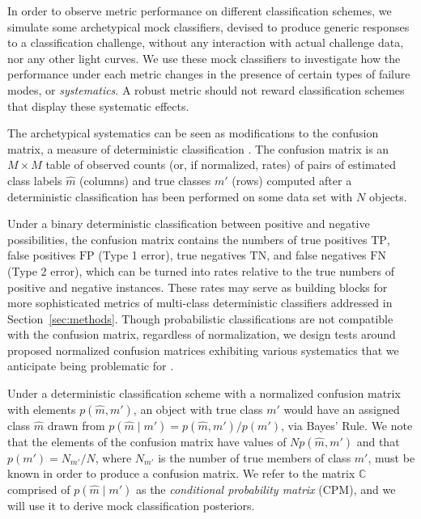 In order to observe metric performance on different classification schemes, we simulate some archetypical mock classifiers, devised to produce generic responses to a classification challenge, without any interaction with actual challenge data, nor any other light curves.
We use these mock classifiers to investigate how the performance under each metric changes in the presence of certain types of failure modes, or \textit{systematics}.
A robust metric should not reward classification schemes that display these systematic effects.

The archetypical systematics can be seen as modifications to the confusion matrix, a measure of deterministic classification \citep{bloom_automating_2012}.
The confusion matrix is an $M \times M$ table of observed counts (or, if normalized, rates) of pairs of estimated class labels $\hat{m}$ (columns) and true classes $m'$ (rows) computed after a deterministic classification has been performed on some data set with $N$ objects.

Under a binary deterministic classification between positive and negative possibilities, the confusion matrix contains the numbers of true positives $\mathrm{TP}$, false positives $\mathrm{FP}$ (Type 1 error), true negatives $\mathrm{TN}$, and false negatives $\mathrm{FN}$ (Type 2 error), which can be turned into rates relative to the true numbers of positive and negative instances.
These rates may serve as building blocks for more sophisticated metrics of multi-class deterministic classifiers addressed in Section~\ref{sec:methods}.
Though probabilistic classifications are not compatible with the confusion matrix, regardless of normalization, we design tests around proposed normalized confusion matrices exhibiting various systematics that we anticipate being problematic for \lsst.

Under a deterministic classification scheme with a normalized confusion matrix with elements $p(\hat{m}, m')$, an object with true class $m'$ would have an assigned class $\hat{m}$ drawn from $p(\hat{m} \mid m') = p(\hat{m}, m') / p(m')$, via Bayes' Rule.
We note that the elements of the confusion matrix have values of $N p(\hat{m}, m')$ and that $p(m') = N_{m'} / N$, where $N_{m'}$ is the number of true members of class $m'$, must be known in order to produce a confusion matrix.
We refer to the matrix $\mathbb{C}$ comprised of $p(\hat{m} \mid m')$ as the \textit{conditional probability matrix} (CPM), and we will use it to derive mock classification posteriors.


